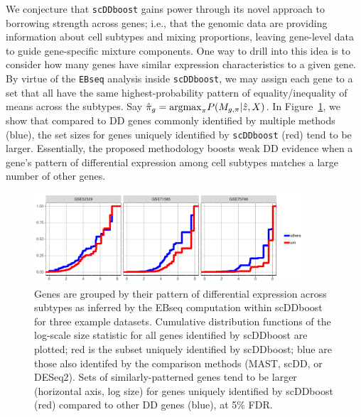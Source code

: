 \documentclass[aoas,preprint]{imsart}
\begin{document}
We conjecture that \verb+scDDboost+ gains power through its novel approach to borrowing strength across genes;
i.e., that the genomic data are providing information about cell subtypes and mixing proportions,
leaving gene-level data to guide gene-specific mixture components. One way to drill into this
idea is to consider how many genes have similar expression characteristics to a given gene.
By virtue of the \verb+EBseq+ analysis inside \verb+scDDboost+, we may assign each gene to
a set that all have the same highest-probability pattern of equality/inequality of means across
the subtypes. Say $\hat \pi_g = {\rm argmax}_{\pi} P( M_{g,\pi} | \hat z, X)$. 
In Figure~\ref{fig:shift}, we show
that compared to DD genes commonly identified by multiple methods (blue), the set sizes for genes
uniquely identified by \verb+scDDboost+ (red) tend to be larger.  Essentially, the proposed methodology
 boosts weak DD evidence when a gene's pattern of differential expression among cell subtypes
matches a large number of other genes. 


\begin{figure}[H]
\includegraphics[width = 0.9\textwidth]{Figs/shift.pdf}
 \caption{
 Genes are grouped by their pattern of differential expression across subtypes as inferred by
the EBseq computation within scDDboost for three example datasets.
 Cumulative distribution
functions of the log-scale size statistic for all genes 
 identified by scDDboost are plotted; red is the subset uniquely identified by scDDboost; blue are those also identifed by the comparison methods (MAST, scDD, or DESeq2).
 Sets of similarly-patterned genes tend to be larger (horizontal axis, log size) for genes uniquely
 identified by scDDboost (red) compared to other DD genes (blue), at 5\% FDR.}
  \label{fig:shift}
\end{figure}
\end{document}
